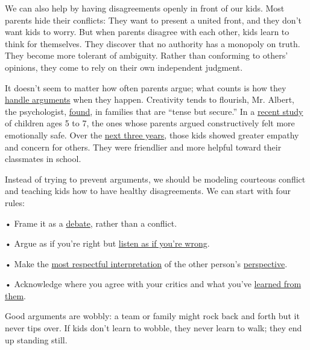 We can also help by having disagreements openly in front of our kids.
Most parents hide their conflicts: They want to present a united front,
and they don't want kids to worry. But when parents disagree with each
other, kids learn to think for themselves. They discover that no
authority has a monopoly on truth. They become more tolerant of
ambiguity. Rather than conforming to others' opinions, they come to rely
on their own independent judgment.

It doesn't seem to matter how often parents argue; what counts is how
they
\href{https://www.guilford.com/books/Marital-Conflict-and-Children/Cummings-Davies/9781462503292}{handle
arguments} when they happen. Creativity tends to flourish, Mr. Albert,
the psychologist,
\href{http://journals.sagepub.com/doi/abs/10.1177/001698627802200214?journalCode=gcqb}{found},
in families that are ``tense but secure.'' In a
\href{http://onlinelibrary.wiley.com/doi/10.1111/j.1469-7610.2008.01945.x/full}{recent
study} of children ages 5 to 7, the ones whose parents argued
constructively felt more emotionally safe. Over the
\href{http://www.nbcnews.com/id/29959807/ns/health-childrens_health/t/how-dare-you-when-mom-dad-disagree/\#.WV-rfumQw2x}{next
three years}, those kids showed greater empathy and concern for others.
They were friendlier and more helpful toward their classmates in school.

Instead of trying to prevent arguments, we should be modeling courteous
conflict and teaching kids how to have healthy disagreements. We can
start with four rules:

• Frame it as a
\href{http://pubsonline.informs.org/doi/pdf/10.1287/orsc.2015.1025}{debate},
rather than a conflict.

• Argue as if you're right but
\href{https://hbr.org/2010/08/its-up-to-you-to-start-a-good}{listen as
if you're wrong}.

• Make the
\href{http://www.nytimes3xbfgragh.onion/2011/01/16/business/16corner.html}{most
respectful interpretation} of the other person's
\href{https://mobile.nytimes3xbfgragh.onion/2017/09/24/opinion/dying-art-of-disagreement.html}{perspective}.

• Acknowledge where you agree with your critics and what you've
\href{https://www.brainpickings.org/2014/03/28/daniel-dennett-rapoport-rules-criticism/}{learned
from them}.

Good arguments are wobbly: a team or family might rock back and forth
but it never tips over. If kids don't learn to wobble, they never learn
to walk; they end up standing still.

